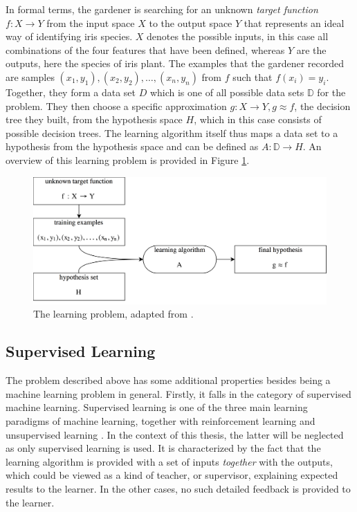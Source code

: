 In formal terms, the gardener is searching for an unknown \textit{target function} $f:X \rightarrow Y$ from the input space $X$ to the output space $Y$ \cite{abu2012learning} that represents an ideal way of identifying iris species. $X$ denotes the possible inputs, in this case all combinations of the four features that have been defined, whereas $Y$ are the outputs, here the species of iris plant. The examples that the gardener recorded are samples $(x_1,y_1),(x_2,y_2),\dots,(x_n,y_n)$ from $f$ such that $f(x_i)=y_i$. Together, they form a data set $D$ which is one of all possible data sets $\mathbb{D}$ for the problem. They then choose a specific approximation $g:X \rightarrow Y,g\approx f$, the decision tree they built, from the hypothesis space $H$, which in this case consists of possible decision trees. The learning algorithm itself thus maps a data set to a hypothesis from the hypothesis space and can be defined as $A:\mathbb{D}\rightarrow H$. An overview of this learning problem is provided in Figure \ref{fig:learning_problem}.

\begin{figure}
\centering
\includegraphics[width=\textwidth]{gfx/machine_learning.png}
\caption{The learning problem, adapted from \cite{abu2012learning}.}
\label{fig:learning_problem}
\end{figure}

\subsection{Supervised Learning}
The problem described above has some additional properties besides being a machine learning problem in general. Firstly, it falls in the category of supervised machine learning. Supervised learning is one of the three main learning paradigms of machine learning, together with reinforcement learning and unsupervised learning \cite{abu2012learning}. In the context of this thesis, the latter will be neglected as only supervised learning is used. It is characterized by the fact that the learning algorithm is provided with a set of inputs \textit{together} with the outputs, which could be viewed as a kind of teacher, or supervisor, explaining expected results to the learner. In the other cases, no such detailed feedback is provided to the learner. 

